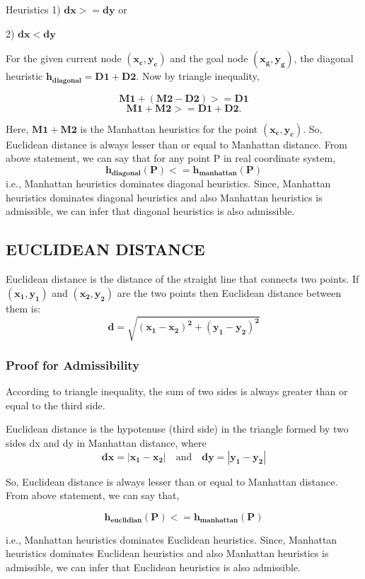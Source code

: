 \documentclass[12pt]{article}
\begin{document}
\begin{section}{Heuristics}
 1) $\mathbf{dx >= dy}$ or \par2) $\mathbf{dx < dy}$

For the given current node $\mathbf{(x_c, y_c)}$ and the goal node $\mathbf{(x_g, y_g)}$, the diagonal heuristic $\mathbf{h_{diagonal} = D1 + D2}$. Now by triangle inequality,

 \[
 {\mathbf{M1 + ( M2 - D2 ) >= D1}} 
\]
\[
 {\mathbf{M1+ M2 >= D1 + D2.}} 
\]

Here, $\mathbf{M1 + M2}$ is the Manhattan heuristics for the point $\mathbf{(x_c, y_c)}$. So, Euclidean distance is always lesser than or equal to Manhattan distance.
From above statement, we can say that for any point P in real coordinate system,
 \[
 {\mathbf{h_{diagonal}(P) <= h_{manhattan}(P)}} 
\]
i.e., Manhattan heuristics dominates diagonal heuristics.  Since, Manhattan heuristics dominates diagonal heuristics and also Manhattan heuristics is admissible, we can infer that diagonal heuristics is also admissible.

\subsection{EUCLIDEAN DISTANCE}
Euclidean distance is the distance of the straight line that connects two points. If $\mathbf{(x_1, y_1)}$ and $\mathbf{(x_2, y_2)}$ are the two points then Euclidean distance between them is:
\begin{equation} \mathbf{d=\sqrt{(x_1-x_2)^2+(y_1-y_2)^2}} \end{equation}  

\subsubsection{Proof for Admissibility}
According to triangle inequality, the sum of two sides is always greater than or equal to the third side.
\par
Euclidean distance is the hypotenuse (third side) in the triangle formed by two sides dx and dy in Manhattan distance, where
 \[
 {\mathbf{dx =|x_1-x_2|  } \quad \textrm{and} \quad \mathbf{dy =|y_1-y_2| } } 
\]

So, Euclidean distance is always lesser than or equal to Manhattan distance. From above statement, we can say that,

 \[
 {\mathbf{h_{euclidian}(P) <= h_{manhattan}(P)}} 
\]

i.e., Manhattan heuristics dominates Euclidean heuristics.  Since, Manhattan heuristics dominates Euclidean heuristics and also Manhattan heuristics is admissible, we can infer that Euclidean heuristics is also admissible.



\end{section}
\end{document}
